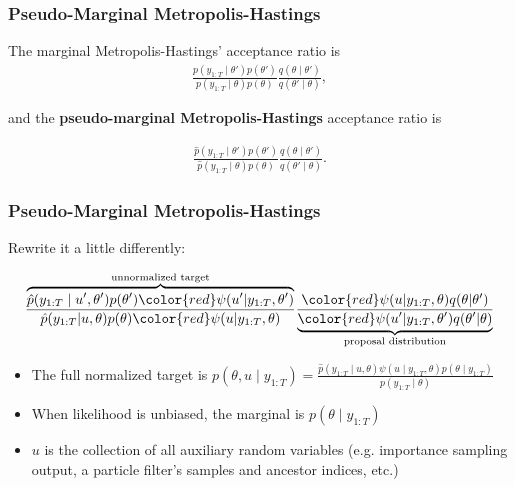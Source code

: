 \documentclass{beamer}
\begin{document}
\begin{frame}[fragile]
\frametitle{Pseudo-Marginal Metropolis-Hastings}

The marginal Metropolis-Hastings' acceptance ratio is
\begin{align*}
\frac{  p(y_{1:T} \mid \theta') p(\theta')}{  p(y_{1:T} \mid \theta) p(\theta) }
\frac{ q(\theta \mid \theta') }{  q(\theta' \mid \theta) },
\end{align*}

and the {\bf pseudo-marginal Metropolis-Hastings} acceptance ratio is 

\begin{align*}
\frac{ \hat{p}(y_{1:T} \mid \theta') p(\theta') }{  \hat{p}(y_{1:T} \mid \theta) p(\theta) }
\frac{ q(\theta \mid \theta') }{  q(\theta' \mid \theta) }.
\end{align*}

\end{frame}

\begin{frame}[fragile]
\frametitle{Pseudo-Marginal Metropolis-Hastings}


Rewrite it a little differently:

\begin{align*}
\frac{ \overbrace{ \hat{p}(y_{1:T} \mid u', \theta')p(\theta') \begingroup\color{red} \psi(u' | y_{1:T},\theta')\endgroup }^{\text{unnormalized target} }}{  \hat{p}(y_{1:T}| u, \theta) p(\theta)\begingroup\color{red}\psi(u|y_{1:T},\theta)\endgroup }
\frac{ \begingroup\color{red} \psi(u|y_{1:T},\theta)\endgroup q(\theta| \theta') }{ \underbrace{ \begingroup\color{red} \psi(u'|y_{1:T},\theta')\endgroup q(\theta'| \theta)}_{\text{proposal distribution} } }
\end{align*}




\begin{itemize}
\item The full normalized target is $p(\theta,u\mid y_{1:T}) =  \frac{\hat{p}(y_{1:T}\mid u, \theta)\psi(u \mid y_{1:T},\theta)p(\theta \mid y_{1:T}) }{p(y_{1:T}\mid \theta) }$
\item When likelihood is unbiased, the marginal is $p(\theta \mid y_{1:T})$
\item $u$ is the collection of all auxiliary random variables (e.g. importance sampling output, a particle filter's samples and ancestor indices, etc.)
\end{itemize}



\end{frame}
\end{document}
